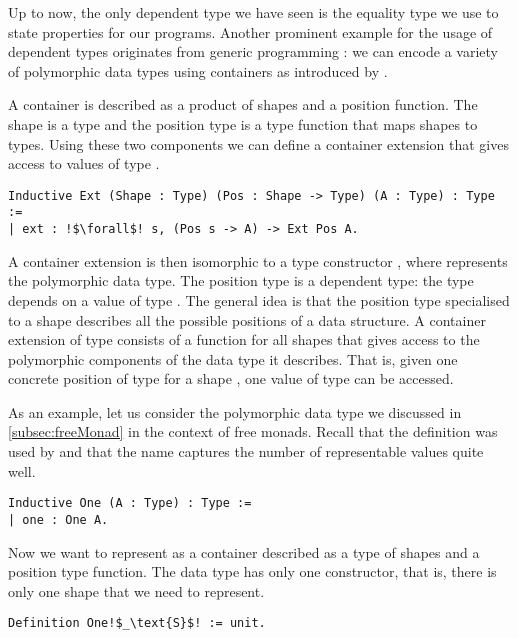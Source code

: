 Up to now, the only dependent type we have seen is the equality type we use to state properties for our programs.
Another prominent example for the usage of dependent types originates from generic programming \citep{altenkirch2003generic,hinze2000new}: we can encode a variety of polymorphic data types using containers as introduced by \citet{abbott2003categories}.

A container is described as a product of shapes and a position function.
The shape is a type  and the position type  is a type function that maps shapes to types.
Using these two components we can define a container extension that gives access to values of type .

\begin{verbatim}
Inductive Ext (Shape : Type) (Pos : Shape -> Type) (A : Type) : Type :=
| ext : !$\forall$! s, (Pos s -> A) -> Ext Pos A.
\end{verbatim}

A container extension  is then isomorphic to a type constructor , where  represents the polymorphic data type.
The position type  is a dependent type: the type depends on a value of type .
The general idea is that the position type specialised to a shape  describes all the possible positions of a data structure.
A container extension of type  consists of a function  for all shapes  that gives access to the polymorphic components of the data type it describes.
That is, given one concrete position of type  for a shape , one value of type  can be accessed.

As an example, let us consider the polymorphic data type  we discussed in \autoref{subsec:freeMonad} in the context of free monads.
Recall that the definition was used by \citet{swierstra2008data} and that the name captures the number of representable values quite well.

\begin{verbatim}
Inductive One (A : Type) : Type :=
| one : One A.
\end{verbatim}

Now we want to represent  as a container described as a type of shapes and a position type function.
The data type  has only one constructor, that is, there is only one shape that we need to represent.

\begin{verbatim}
Definition One!$_\text{S}$! := unit.
\end{verbatim}

